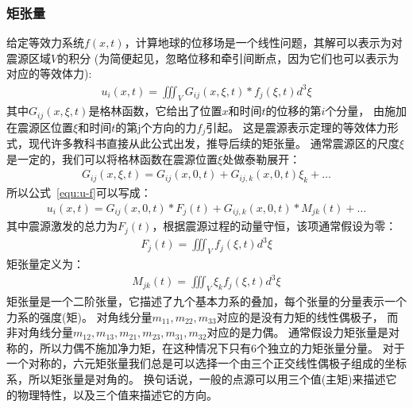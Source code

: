 \subsubsection{矩张量}
给定等效力系统$f(x, t)$，计算地球的位移场是一个线性问题，其解可以表示为对震源区域$V$的积分
(为简便起见，忽略位移和牵引间断点，因为它们也可以表示为对应的等效体力):
\begin{align}
    u_i(x,t) = \iiint\nolimits_V G_{ij}(x,\xi,t) \ast f_j(\xi,t) d^3\xi
  \label{equ:u-f}
\end{align}
其中$G_{ij}(x,\xi,t)$是格林函数，它给出了位置$x$和时间$t$的位移的第$i$个分量，
由施加在震源区位置$\xi$和时间$t$的第j个方向的力$f_j$引起。
这是震源表示定理的等效体力形式，现代许多教科书直接从此公式出发，推导后续的矩张量。
通常震源区的尺度$\xi$是一定的，我们可以将格林函数在震源位置$\xi$处做泰勒展开：
\begin{align}
    G_{ij}(x,\xi,t)  = G_{ij}(x,0,t) + G_{ij,k}(x,0,t)\xi_k + \dots
  \label{equ:G-taylor}
\end{align}
所以公式~\ref{equ:u-f}可以写成：
\begin{align}
    u_i(x,t) = G_{ij}(x,0,t) \ast F_j(t) + G_{ij,k}(x,0,t) \ast M_{jk}(t) + \dots
  \label{equ:u-f-T}
\end{align}
其中震源激发的总力为$F_j(t)$，根据震源过程的动量守恒，该项通常假设为零：
\begin{align}
    F_j(t) = \iiint\nolimits_V  f_j(\xi,t) d^3\xi
  \label{equ:F0}
\end{align}
矩张量定义为：
\begin{align}
    M_{jk}(t) =  \iiint\nolimits_{V} \xi_k f_j(\xi,t)  d^3\xi
  \label{equ:mt-eq}
\end{align}
矩张量是一个二阶张量，它描述了九个基本力系的叠加，每个张量的分量表示一个力系的强度(矩)。
对角线分量$m_{11},m_{22},m_{33}$对应的是没有力矩的线性偶极子，
而非对角线分量$m_{12},m_{13},m_{21},m_{23},m_{31},m_{32}$对应的是力偶。
通常假设力矩张量是对称的，所以力偶不施加净力矩，在这种情况下只有6个独立的力矩张量分量。
对于一个对称的，六元矩张量我们总是可以选择一个由三个正交线性偶极子组成的坐标系，所以矩张量是对角的。
换句话说，一般的点源可以用三个值(主矩)来描述它的物理特性，以及三个值来描述它的方向。




